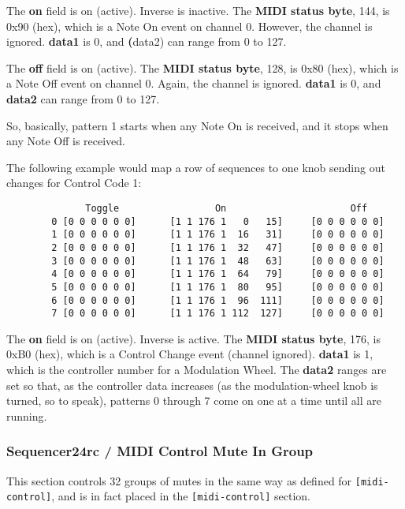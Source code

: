    The \textbf{on} field is on (active).  Inverse is inactive.  The
   \textbf{MIDI status byte}, 144, is 0x90 (hex), which is a Note On event
   on channel 0.  However, the channel is ignored.  \textbf{data1} is 0, and
   \textbf(data2) can range from 0 to 127.

   The \textbf{off} field is on (active).  The \textbf{MIDI status byte},
   128, is 0x80 (hex), which is a Note Off event on channel 0.  Again, the
   channel is ignored.  \textbf{data1} is 0, and \textbf{data2} can range
   from 0 to 127.

   So, basically, pattern 1 starts when any Note On is received, and
   it stops when any Note Off is received.

   The following example would map a row of sequences to one knob sending
   out changes for Control Code 1:

   \begin{verbatim}
	          Toggle                 On                      Off
        0 [0 0 0 0 0 0]      [1 1 176 1   0   15]     [0 0 0 0 0 0]
        1 [0 0 0 0 0 0]      [1 1 176 1  16   31]     [0 0 0 0 0 0]
        2 [0 0 0 0 0 0]      [1 1 176 1  32   47]     [0 0 0 0 0 0]
        3 [0 0 0 0 0 0]      [1 1 176 1  48   63]     [0 0 0 0 0 0]
        4 [0 0 0 0 0 0]      [1 1 176 1  64   79]     [0 0 0 0 0 0]
        5 [0 0 0 0 0 0]      [1 1 176 1  80   95]     [0 0 0 0 0 0]
        6 [0 0 0 0 0 0]      [1 1 176 1  96  111]     [0 0 0 0 0 0]
        7 [0 0 0 0 0 0]      [1 1 176 1 112  127]     [0 0 0 0 0 0]
   \end{verbatim}

   The \textbf{on} field is on (active).  Inverse is active.  The
   \textbf{MIDI status byte}, 176, is 0xB0 (hex), which is a Control Change
   event (channel ignored).  \textbf{data1} is 1, which is the controller
   number for a Modulation Wheel.  The \textbf{data2} ranges are set so
   that, as the controller data increases (as the modulation-wheel knob is
   turned, so to speak), patterns 0 through 7 come on one at a time until
   all are running.

\subsubsection{Sequencer24rc / MIDI Control Mute In Group}
\label{subsubsec:seq24_rc_file_midi_control_mute_in_group}

   This section controls 32 groups of mutes in the same way as 
	defined for \texttt{[midi-control]}, and is in fact placed in the
   \texttt{[midi-control]} section.

